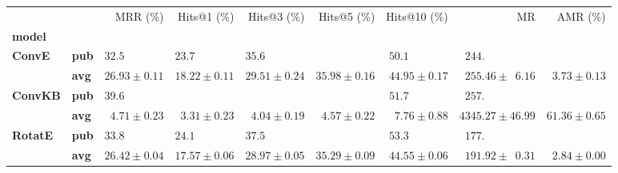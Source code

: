 \begin{tabular}{llrrrrrrr}
\toprule
       &     &                    MRR (\%) &                 Hits@1 (\%) &                 Hits@3 (\%) &                 Hits@5 (\%) &                Hits@10 (\%) &                                       MR &                    AMR (\%) \\
\textbf{model} & {} &                             &                             &                             &                             &                             &                                          &                             \\
\midrule
\textbf{ConvE} & \textbf{pub} &  $32.5\phantom{0 \pm 0.00}$ &  $23.7\phantom{0 \pm 0.00}$ &  $35.6\phantom{0 \pm 0.00}$ &                             &  $50.1\phantom{0 \pm 0.00}$ &  $\phantom{0}244.\phantom{00 \pm 00.00}$ &                             \\
       & \textbf{avg} &            $26.93 \pm 0.11$ &            $18.22 \pm 0.11$ &            $29.51 \pm 0.24$ &            $35.98 \pm 0.16$ &            $44.95 \pm 0.17$ &  $\phantom{0}255.46 \pm \phantom{0}6.16$ &  $\phantom{0}3.73 \pm 0.13$ \\\midrule
\textbf{ConvKB} & \textbf{pub} &  $39.6\phantom{0 \pm 0.00}$ &                             &                             &                             &  $51.7\phantom{0 \pm 0.00}$ &  $\phantom{0}257.\phantom{00 \pm 00.00}$ &                             \\
       & \textbf{avg} &  $\phantom{0}4.71 \pm 0.23$ &  $\phantom{0}3.31 \pm 0.23$ &  $\phantom{0}4.04 \pm 0.19$ &  $\phantom{0}4.57 \pm 0.22$ &  $\phantom{0}7.76 \pm 0.88$ &                      $4345.27 \pm 46.99$ &            $61.36 \pm 0.65$ \\\midrule
\textbf{RotatE} & \textbf{pub} &  $33.8\phantom{0 \pm 0.00}$ &  $24.1\phantom{0 \pm 0.00}$ &  $37.5\phantom{0 \pm 0.00}$ &                             &  $53.3\phantom{0 \pm 0.00}$ &  $\phantom{0}177.\phantom{00 \pm 00.00}$ &                             \\
       & \textbf{avg} &            $26.42 \pm 0.04$ &            $17.57 \pm 0.06$ &            $28.97 \pm 0.05$ &            $35.29 \pm 0.09$ &            $44.55 \pm 0.06$ &  $\phantom{0}191.92 \pm \phantom{0}0.31$ &  $\phantom{0}2.84 \pm 0.00$ \\
\bottomrule
\end{tabular}

